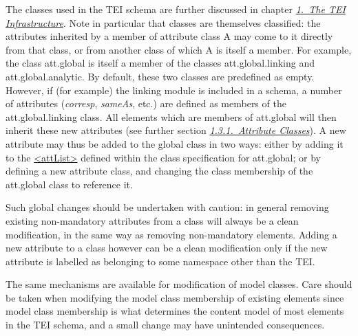 The classes used in the TEI schema are further discussed in chapter \textit{\hyperref[ST]{1.\ The TEI Infrastructure}}. Note in particular that classes are themselves classified: the attributes inherited by a member of attribute class A may come to it directly from that class, or from another class of which A is itself a member. For example, the class \textsf{att.global} is itself a member of the classes \textsf{att.global.linking} and \textsf{att.global.analytic}. By default, these two classes are predefined as empty. However, if (for example) the \textsf{linking} module is included in a schema, a number of attributes ({\itshape corresp}, {\itshape sameAs}, etc.) are defined as members of the \textsf{att.global.linking} class. All elements which are members of \textsf{att.global} will then inherit these new attributes (see further section \textit{\hyperref[STECAT]{1.3.1.\ Attribute Classes}}). A new attribute may thus be added to the global class in two ways: either by adding it to the \hyperref[TEI.attList]{<attList>} defined within the class specification for \textsf{att.global}; or by defining a new attribute class, and changing the class membership of the \textsf{att.global} class to reference it.\par
Such global changes should be undertaken with caution: in general removing existing non-mandatory attributes from a class will always be a clean modification, in the same way as removing non-mandatory elements. Adding a new attribute to a class however can be a clean modification only if the new attribute is labelled as belonging to some namespace other than the TEI.\par
The same mechanisms are available for modification of model classes. Care should be taken when modifying the model class membership of existing elements since model class membership is what determines the content model of most elements in the TEI schema, and a small change may have unintended consequences. 
